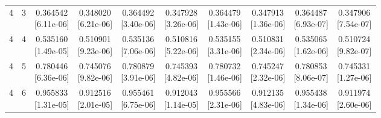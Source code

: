 \documentclass[12pt,letterpaper]{article}
\theoremstyle{plain}
\theoremstyle{definition}
\begin{document}
\begin{table}[p]
\begin{adjustbox}{max width=\linewidth}
\begin{tabular}{@{}rr*{8}{c}@{}}
4 & 3 & \shortstack{0.364542\\[-1pt]{\scriptsize[6.11e-06]}} & \shortstack{0.348020\\[-1pt]{\scriptsize[6.21e-06]}} & \shortstack{0.364492\\[-1pt]{\scriptsize[3.40e-06]}} & \shortstack{0.347928\\[-1pt]{\scriptsize[3.26e-06]}} & \shortstack{0.364479\\[-1pt]{\scriptsize[1.43e-06]}} & \shortstack{0.347913\\[-1pt]{\scriptsize[1.36e-06]}} & \shortstack{0.364487\\[-1pt]{\scriptsize[6.93e-07]}} & \shortstack{0.347906\\[-1pt]{\scriptsize[7.54e-07]}}\\
4 & 4 & \shortstack{0.535160\\[-1pt]{\scriptsize[1.49e-05]}} & \shortstack{0.510901\\[-1pt]{\scriptsize[9.23e-06]}} & \shortstack{0.535136\\[-1pt]{\scriptsize[7.06e-06]}} & \shortstack{0.510816\\[-1pt]{\scriptsize[5.22e-06]}} & \shortstack{0.535155\\[-1pt]{\scriptsize[3.31e-06]}} & \shortstack{0.510831\\[-1pt]{\scriptsize[2.34e-06]}} & \shortstack{0.535065\\[-1pt]{\scriptsize[1.62e-06]}} & \shortstack{0.510724\\[-1pt]{\scriptsize[9.82e-07]}}\\
4 & 5 & \shortstack{0.780446\\[-1pt]{\scriptsize[6.36e-06]}} & \shortstack{0.745076\\[-1pt]{\scriptsize[9.82e-06]}} & \shortstack{0.780879\\[-1pt]{\scriptsize[3.91e-06]}} & \shortstack{0.745393\\[-1pt]{\scriptsize[4.82e-06]}} & \shortstack{0.780732\\[-1pt]{\scriptsize[1.46e-06]}} & \shortstack{0.745247\\[-1pt]{\scriptsize[2.32e-06]}} & \shortstack{0.780853\\[-1pt]{\scriptsize[8.06e-07]}} & \shortstack{0.745331\\[-1pt]{\scriptsize[1.27e-06]}}\\
4 & 6 & \shortstack{0.955833\\[-1pt]{\scriptsize[1.31e-05]}} & \shortstack{0.912516\\[-1pt]{\scriptsize[2.01e-05]}} & \shortstack{0.955461\\[-1pt]{\scriptsize[6.75e-06]}} & \shortstack{0.912043\\[-1pt]{\scriptsize[1.14e-05]}} & \shortstack{0.955566\\[-1pt]{\scriptsize[2.31e-06]}} & \shortstack{0.912135\\[-1pt]{\scriptsize[4.83e-06]}} & \shortstack{0.955438\\[-1pt]{\scriptsize[1.34e-06]}} & \shortstack{0.911974\\[-1pt]{\scriptsize[2.60e-06]}}\\

\end{tabular}
\end{adjustbox}
\end{table}
\end{document}
